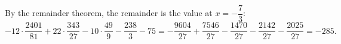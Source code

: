 By the remainder theorem, the remainder is the value at $x=-\dfrac73$:
\[-12\cdot\dfrac{2401}{81}+22\cdot\dfrac{343}{27}-10\cdot\dfrac{49}9-\dfrac{238}3-75=-\dfrac{9604}{27}+\dfrac{7546}{27}-\dfrac{1470}{27}-\dfrac{2142}{27}-\dfrac{2025}{27}=\boxed{-285}.\]
